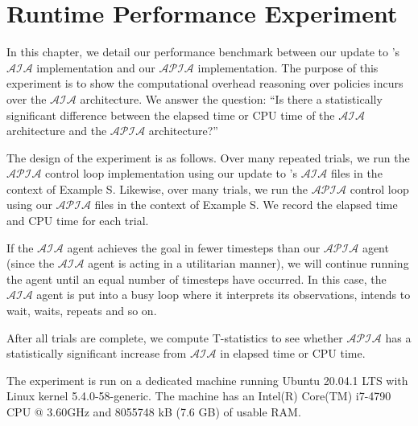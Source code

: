 \chapter{Runtime Performance Experiment}

%

In this chapter, we detail our performance benchmark between our update to \citet{blount_architecture_2013,blount_towards_2014}'s $\mathcal{AIA}$ implementation and our $\mathcal{APIA}$ implementation.
The purpose of this experiment is to show the computational overhead reasoning over policies incurs over the $\mathcal{AIA}$ architecture.
We answer the question: ``Is there a statistically significant difference between the elapsed time or CPU time of the $\mathcal{AIA}$ architecture and the $\mathcal{APIA}$ architecture?''

The design of the experiment is as follows.
Over many repeated trials, we run the $\mathcal{APIA}$ control loop implementation using our update to \citet{blount_architecture_2013,blount_towards_2014}'s $\mathcal{AIA}$ files in the context of Example S.
Likewise, over many trials, we run the $\mathcal{APIA}$ control loop using our $\mathcal{APIA}$ files in the context of Example S.
We record the elapsed time and CPU time for each trial.

If the $\mathcal{AIA}$ agent achieves the goal in fewer timesteps than our $\mathcal{APIA}$ agent (since the $\mathcal{AIA}$ agent is acting in a utilitarian manner), we will continue running the agent until an equal number of timesteps have occurred.
In this case, the $\mathcal{AIA}$ agent is put into a busy loop where it interprets its observations, intends to wait, waits, repeats and so on.

After all trials are complete, we compute T-statistics to see whether $\mathcal{APIA}$ has a statistically significant increase from $\mathcal{AIA}$ in elapsed time or CPU time.

The experiment is run on a dedicated machine running Ubuntu 20.04.1 LTS with Linux kernel 5.4.0-58-generic.
The machine has an Intel(R) Core(TM) i7-4790 CPU @ 3.60GHz and 8055748 kB (7.6 GB) of usable RAM.
